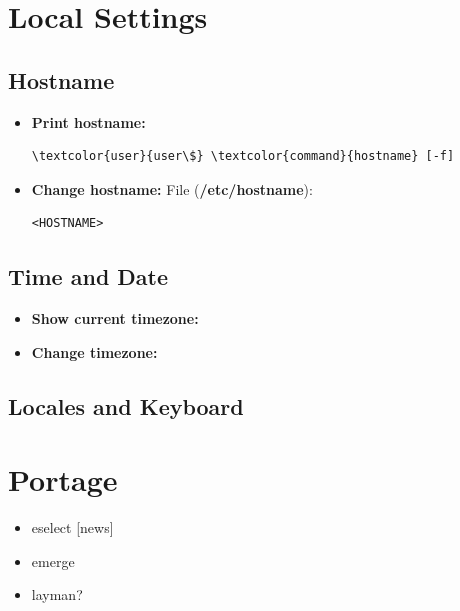 \documentclass[10pt, a4paper, onecolumn, oneside, titlepage, openany]{book}
\begin{document}
\chapter{Local Settings}
\section{Hostname}
\begin{itemize}
    \item \textbf{Print hostname:}
\begin{Verbatim}[commandchars=\\\{\}]
\textcolor{user}{user\$} \textcolor{command}{hostname} [-f]
\end{Verbatim}
    \item \textbf{Change hostname:}
\newline File (\textbf{\textcolor{file}{/etc/hostname}}):
\begin{verbatim}
<HOSTNAME>
\end{verbatim}
\end{itemize}

\section{Time and Date}
\begin{itemize}
    \item \textbf{Show current timezone:}


    \item \textbf{Change timezone:}
\end{itemize}


\section{Locales and Keyboard}



\chapter{Portage}
\begin{itemize}
    \item eselect [news]
    \item emerge
    \item layman?
\end{itemize}
\end{document}
